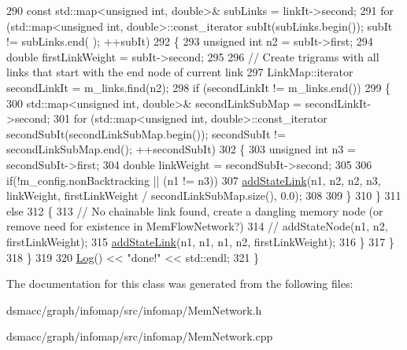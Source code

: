 \begin{DoxyCode}
290         \textcolor{keyword}{const} std::map<unsigned int, double>& subLinks = linkIt->second;
291         \textcolor{keywordflow}{for} (std::map<unsigned int, double>::const\_iterator subIt(subLinks.begin()); subIt != subLinks.end(
      ); ++subIt)
292         \{
293             \textcolor{keywordtype}{unsigned} \textcolor{keywordtype}{int} n2 = subIt->first;
294             \textcolor{keywordtype}{double} firstLinkWeight = subIt->second;
295 
296             \textcolor{comment}{// Create trigrams with all links that start with the end node of current link}
297             LinkMap::iterator secondLinkIt = m\_links.find(n2);
298             \textcolor{keywordflow}{if} (secondLinkIt != m\_links.end())
299             \{
300                 std::map<unsigned int, double>& secondLinkSubMap = secondLinkIt->second;
301                 \textcolor{keywordflow}{for} (std::map<unsigned int, double>::const\_iterator secondSubIt(secondLinkSubMap.begin()); 
      secondSubIt != secondLinkSubMap.end(); ++secondSubIt)
302                 \{
303                     \textcolor{keywordtype}{unsigned} \textcolor{keywordtype}{int} n3 = secondSubIt->first;
304                     \textcolor{keywordtype}{double} linkWeight = secondSubIt->second;
305 
306                     \textcolor{keywordflow}{if}(!m\_config.nonBacktracking || (n1 != n3))
307                         \mbox{\hyperlink{classMemNetwork_aed51978dfece1214f4fa9ea2bfebc492}{addStateLink}}(n1, n2, n2, n3, linkWeight, firstLinkWeight / 
      secondLinkSubMap.size(), 0.0);
308 
309                 \}
310             \}
311             \textcolor{keywordflow}{else}
312             \{
313                 \textcolor{comment}{// No chainable link found, create a dangling memory node (or remove need for existence in
       MemFlowNetwork?)}
314 \textcolor{comment}{//              addStateNode(n1, n2, firstLinkWeight);}
315                 \mbox{\hyperlink{classMemNetwork_aed51978dfece1214f4fa9ea2bfebc492}{addStateLink}}(n1, n1, n1, n2, firstLinkWeight);
316             \}
317         \}
318     \}
319 
320     \mbox{\hyperlink{classLog}{Log}}() << \textcolor{stringliteral}{"done!"} << std::endl;
321 \}
\end{DoxyCode}


The documentation for this class was generated from the following files\+:\begin{DoxyCompactItemize}
\item 
dsmacc/graph/infomap/src/infomap/Mem\+Network.\+h\item 
dsmacc/graph/infomap/src/infomap/Mem\+Network.\+cpp\end{DoxyCompactItemize}
